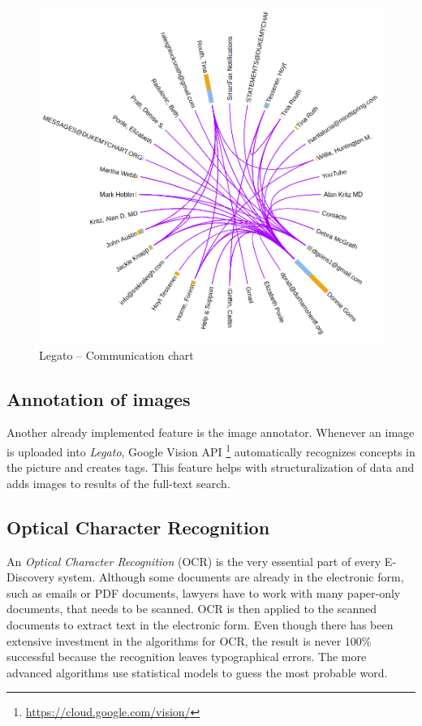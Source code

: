 \documentclass[
  digital, %
  notable,   %
  nolof,     %
  nolot,     %
]{fithesis3}
\begin{document}
\begin{figure}[h]
\caption{Legato -- Communication chart}
\label{fig:legato_communication}
\includegraphics[width=\textwidth]{img/Legato-Communication}
\end{figure}

\subsection*{Annotation of images}
Another already implemented feature is the image annotator.
Whenever an image is uploaded into \textit{Legato}, Google Vision API \footnote{\url{https://cloud.google.com/vision/}} automatically recognizes concepts in the picture and creates tags.
This feature helps with structuralization of data and adds images to results of the full-text search.

\subsection*{Optical Character Recognition}
An \textit{Optical Character Recognition} (OCR) is the very essential part of every E-Discovery system.
Although some documents are already in the electronic form, such as emails or PDF documents, lawyers have to work with many paper-only documents, that needs to be scanned.
OCR is then applied to the scanned documents to extract text in the electronic form.
Even though there has been extensive investment in the algorithms for OCR, the result is never 100\% successful because the recognition leaves typographical errors.
The more advanced algorithms use statistical models to guess the most probable word.
\end{document}

